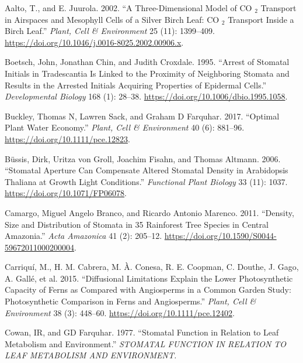 \documentclass[12pt,halfline,a4paper,]{ouparticle}
\newlength{\cslhangindent}
\newlength{\cslentryspacingunit} %
\newenvironment{CSLReferences}[2] %
 {%
  \setlength{\parindent}{0pt}
  \ifodd #1
  \let\oldpar\par
  \def\par{\hangindent=\cslhangindent\oldpar}
  \fi
  \setlength{\parskip}{#2\cslentryspacingunit}
 }%
 {}
\begin{document}
\hypertarget{refs}{}
\begin{CSLReferences}{1}{0}
\leavevmode{}%
Aalto, T., and E. Juurola. 2002. {``A Three-Dimensional Model of {CO}
\(_{\textrm{2}}\) Transport in Airspaces and Mesophyll Cells of a Silver
Birch Leaf: {CO} \(_{\textrm{2}}\) Transport Inside a Birch Leaf.''}
\emph{Plant, Cell \& Environment} 25 (11): 1399--409.
\url{https://doi.org/10.1046/j.0016-8025.2002.00906.x}.

\leavevmode{}%
Boetsch, John, Jonathan Chin, and Judith Croxdale. 1995. {``Arrest of
{Stomatal} {Initials} in {Tradescantia} {Is} {Linked} to the {Proximity}
of {Neighboring} {Stomata} and {Results} in the {Arrested} {Initials}
{Acquiring} {Properties} of {Epidermal} {Cells}.''} \emph{Developmental
Biology} 168 (1): 28--38. \url{https://doi.org/10.1006/dbio.1995.1058}.

\leavevmode{}%
Buckley, Thomas N, Lawren Sack, and Graham D Farquhar. 2017. {``Optimal
Plant Water Economy.''} \emph{Plant, Cell \& Environment} 40 (6):
881--96. \url{https://doi.org/10.1111/pce.12823}.

\leavevmode{}%
Büssis, Dirk, Uritza von Groll, Joachim Fisahn, and Thomas Altmann.
2006. {``Stomatal Aperture Can Compensate Altered Stomatal Density in
{Arabidopsis} Thaliana at Growth Light Conditions.''} \emph{Functional
Plant Biology} 33 (11): 1037. \url{https://doi.org/10.1071/FP06078}.

\leavevmode{}%
Camargo, Miguel Angelo Branco, and Ricardo Antonio Marenco. 2011.
{``Density, Size and Distribution of Stomata in 35 Rainforest Tree
Species in {Central} {Amazonia}.''} \emph{Acta Amazonica} 41 (2):
205--12. \url{https://doi.org/10.1590/S0044-59672011000200004}.

\leavevmode{}%
Carriquí, M., H. M. Cabrera, M. À. Conesa, R. E. Coopman, C. Douthe, J.
Gago, A. Gallé, et al. 2015. {``Diffusional Limitations Explain the
Lower Photosynthetic Capacity of Ferns as Compared with Angiosperms in a
Common Garden Study: {Photosynthetic} Comparison in Ferns and
Angiosperms.''} \emph{Plant, Cell \& Environment} 38 (3): 448--60.
\url{https://doi.org/10.1111/pce.12402}.

\leavevmode{}%
Cowan, IR, and GD Farquhar. 1977. {``Stomatal Function in Relation to
Leaf Metabolism and Environment.''} \emph{STOMATAL FUNCTION IN RELATION
TO LEAF METABOLISM AND ENVIRONMENT.}


\end{CSLReferences}
\end{document}
